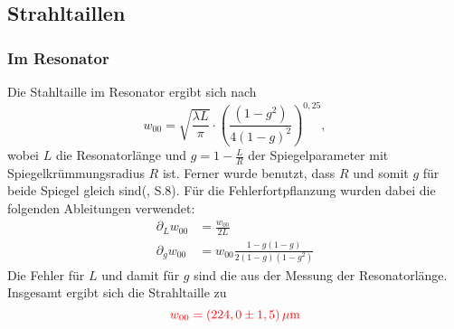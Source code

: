 \subsection{Strahltaillen}
\subsubsection*{Im Resonator}
Die Stahltaille im Resonator ergibt sich nach 
\begin{equation*}
    w_{00} = \sqrt{\frac{\lambda L}{\pi}} \cdot (\frac{(1-g^2)}{4(1-g)^2})^{0,25},
\end{equation*}
wobei $L$ die Resonatorlänge und $g = 1 - \frac{L}{R}$ der Spiegelparameter mit Spiegelkrümmungsradius $R$ ist. Ferner wurde benutzt, dass $R$ und somit $g$ für beide Spiegel 
gleich sind(\cite{TUB2018}, S.8). 
Für die Fehlerfortpflanzung wurden dabei die folgenden Ableitungen verwendet:
\begin{align*}
    \partial_Lw_{00}  &= \frac{w_{00}}{2L}\\
    \partial_gw_{00} &= w_{00} \frac{1 - g(1-g)}{2(1-g)(1-g^2)}
\end{align*}
Die Fehler für $L$ und damit für $g$ sind die aus der Messung der Resonatorlänge. Insgesamt ergibt sich die Strahltaille zu
\begin{equation*}
    \textcolor{red}{w_{00} = (224,0 \pm 1,5)\,\mu\mathrm{m}}
\end{equation*}


